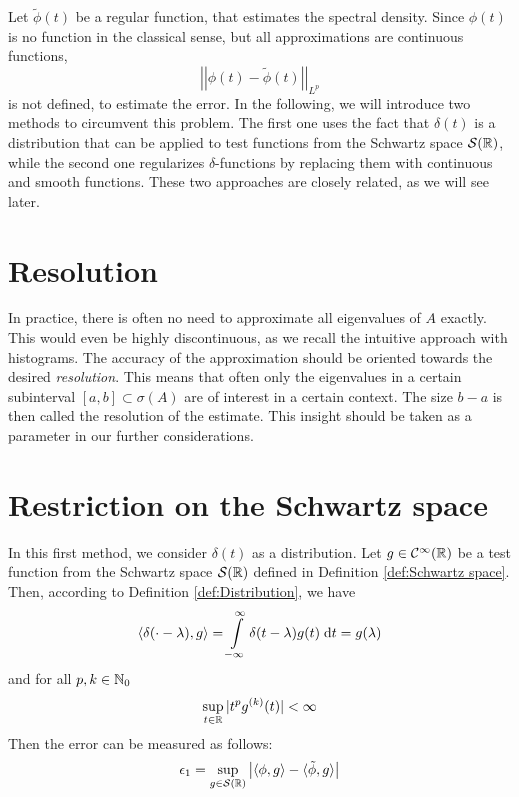 Let $\tilde{\phi}(t)$ be a regular function, that estimates the spectral density.
Since $\phi(t)$ is no function in the classical sense, but all approximations are continuous functions,
\[
\left|\left|\phi(t) - \tilde{\phi}(t)\right|\right|_{L^p}
\]
is not defined, to estimate the error.
In the following, we will introduce two methods to circumvent this problem.
The first one uses the fact that $\delta(t)$ is a distribution that can be applied to test functions from the Schwartz space $\mathcal{S}(\mathbb{R})$,
while the second one regularizes $\delta$-functions by replacing them with continuous and smooth functions.
These two approaches are closely related, as we will see later.

\section{Resolution}
In practice, there is often no need to approximate all eigenvalues of $A$ exactly.
This would even be highly discontinuous, as we recall the intuitive approach with histograms.
The accuracy of the approximation should be oriented towards the desired \emph{resolution}.
This means that often only the eigenvalues in a certain subinterval $[a, b] \subset \sigma(A)$ are of interest in a certain context.
The size $b - a$ is then called the resolution of the estimate.
This insight should be taken as a parameter in our further considerations.

\section{Restriction on the Schwartz space}
In this first method, we consider $\delta(t)$ as a distribution.
Let $g \in \mathcal{C}^{\infty}(\mathbb{R})$ be a test function from the Schwartz space $\mathcal{S}(\mathbb{R})$ defined in Definition \ref{def:Schwartz space}.
Then, according to Definition \ref{def:Distribution}, we have
\[
\langle \delta(\cdot - \lambda), g \rangle = \int\limits_{-\infty}^{\infty} \delta(t - \lambda) g(t) \;\mathrm{d}t = g(\lambda)
\]
and for all $p, k \in \mathbb{N}_0$
\[
\sup_{t \in \mathbb{R}} |t^pg^{(k)}(t)| < \infty
\]
Then the error can be measured as follows:
\[
\epsilon_1 = \sup_{g \in \mathcal{S}(\mathbb{R})} \left| \langle \phi, g \rangle - \langle \tilde{\phi}, g \rangle \right|
\]

